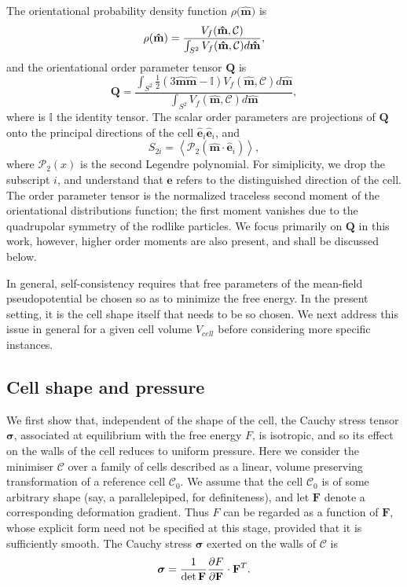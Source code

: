 \documentclass{article}
\begin{document}
The orientational probability density function $\rho (\mathbf{\hat{m})}$ is 
\begin{equation}
\rho (\mathbf{\hat{m}})=\frac{V_{f}(\mathbf{\hat{m}},\mathcal{C})}{%
\int_{S^{2}}V_{f}(\mathbf{\hat{m}},\mathcal{C})d\mathbf{\hat{m}}},
\end{equation}%
and the orientational order parameter tensor $\mathbf{Q}$ is%
\begin{equation}
\mathbf{Q}=\frac{\int_{S^{2}}\frac{1}{2}(3\mathbf{\hat{m}\hat{m}}-\mathbb{I}%
)V_{f}(\mathbf{\hat{m},}\mathcal{C})d\mathbf{\hat{m}}}{\int_{S^{2}}V_{f}(%
\mathbf{\hat{m},}\mathcal{C})d\mathbf{\hat{m}}},
\end{equation}%
where is $\mathbb{I}$ the identity tensor. The scalar order parameters are
projections of $\mathbf{Q}$ onto the principal directions of the cell $%
\mathbf{\hat{e}}_{i}\mathbf{\hat{e}}_{i}$, and 
\begin{equation}
S_{2i}=\left\langle \mathcal{P}_{2}(\mathbf{\hat{m}\cdot \hat{e}}%
_{i})\right\rangle ,
\end{equation}%
where $\mathcal{P}_{2}(x)$ is the second Legendre polynomial. For
simiplicity, we drop the subscript $i$, and understand that $\mathbf{\hat{e}}
$ refers to the distinguished direction of the cell. The order parameter
tensor is the normalized traceless second moment of the orientational
distributions function; the first moment vanishes due to the quadrupolar
symmetry of the rodlike particles. We focus primarily on $\mathbf{Q}$ in
this work, however, higher order moments are also present, and shall be
discussed below.

In general, self-consistency requires that free parameters of the mean-field
pseudopotential be chosen so as to minimize the free energy. In the present
setting, it is the cell shape itself that needs to be so chosen. We next
address this issue in general for a given cell volume $V_{cell}$ before
considering more specific instances.

\subsection{Cell shape and pressure}

We first show that, independent of the shape of the cell, the Cauchy stress
tensor $\boldsymbol{\sigma}$, associated at equilibrium with the free energy 
$F$, is isotropic, and so its effect on the walls of the cell reduces to
uniform pressure. Here we consider the minimiser $\mathcal{C}$ over a family
of cells described as a linear, volume preserving transformation of a
reference cell $\mathcal{C}_0$. We assume that the cell $\mathcal{C}_{0}$ is
of some arbitrary shape (say, a parallelepiped, for definiteness), and let $%
\mathbf{F}$ denote a corresponding deformation gradient. Thus $F$ can be
regarded as a function of $\mathbf{F}$, whose explicit form need not be
specified at this stage, provided that it is sufficiently smooth. The Cauchy
stress $\boldsymbol{\sigma }$ exerted on the walls of $\mathcal{C}$ is \cite{Spencer}
\begin{equation}
\boldsymbol{\sigma }=\frac{1}{\det {\mathbf{F}}}\frac{\partial F}{\partial {%
\mathbf{F}}}\cdot {\mathbf{F}}^{T}.  \label{eq_var_1}
\end{equation}
\end{document}
